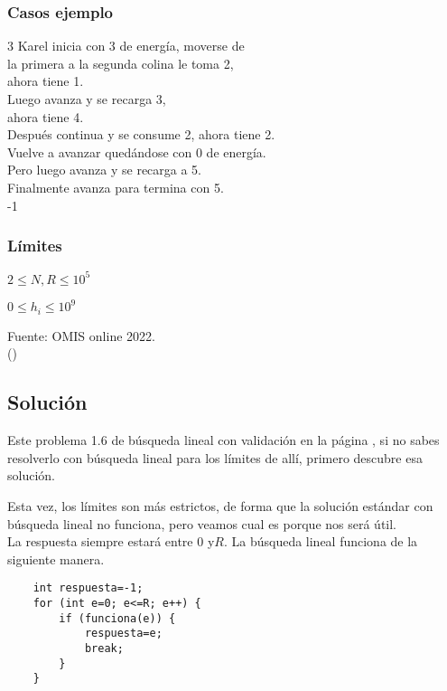 \subsubsection*{Casos ejemplo}
\begin{casebox3}	
	{3}
	{
		Karel inicia con 3 de energía, moverse de   \\
		la primera a la segunda colina le toma 2,  \\
		ahora tiene 1.\\
		Luego avanza y se recarga 3,\\
		ahora tiene 4.\\
		Después continua y se consume 2, ahora tiene 2. \\
		Vuelve a avanzar quedándose con 0 de energía. \\		
		Pero luego avanza y se recarga a 5. \\
		Finalmente avanza para termina con 5. \\
	}
	{-1}
	{}
	\hline
\end{casebox3}	

\subsubsection*{Límites}
\begin{plimits}
	\item \(2\leq N, R \leq 10^5\)
	\item \(0\leq h_i\leq 10^9\)
\end{plimits}

Fuente: OMIS online 2022.\\
\footnotesize{()}
\pagebreak
\subsection*{Solución}
Este problema 1.6 de búsqueda lineal con validación en la página \pageref{bicicleta}, si no sabes resolverlo con búsqueda lineal para los límites de allí, primero descubre esa solución.

Esta vez, los límites son más estrictos, de forma que la solución estándar con búsqueda lineal no funciona, pero veamos cual es porque nos será útil.
\\

La respuesta siempre estará entre \(0\)  y\(R\). La búsqueda lineal funciona de la siguiente manera.
\begin{lstlisting}
	int respuesta=-1;
	for (int e=0; e<=R; e++) {
		if (funciona(e)) {
			respuesta=e;
			break;
		}
	}
\end{lstlisting}

